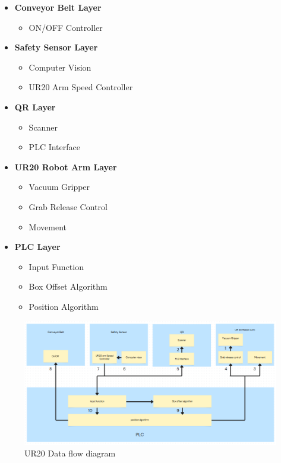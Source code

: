
\begin{itemize}
    \item \textbf{Conveyor Belt Layer}
    \begin{itemize}
        \item ON/OFF Controller
    \end{itemize}

    \item \textbf{Safety Sensor Layer}
    \begin{itemize}
        \item Computer Vision
        \item UR20 Arm Speed Controller
    \end{itemize}

    \item \textbf{QR Layer}
    \begin{itemize}
        \item Scanner
        \item PLC Interface
    \end{itemize}

    \item \textbf{UR20 Robot Arm Layer}
    \begin{itemize}
        \item Vacuum Gripper
        \item Grab Release Control
        \item Movement
    \end{itemize}

    \item \textbf{PLC Layer}
    \begin{itemize}
        \item Input Function
        \item Box Offset Algorithm
        \item Position Algorithm
    \end{itemize}
\end{itemize}
\begin{figure}[h!]
	\centering
 	\includegraphics[width=\textwidth]{images/data_flow}
 \caption{UR20 Data flow diagram}
\end{figure}